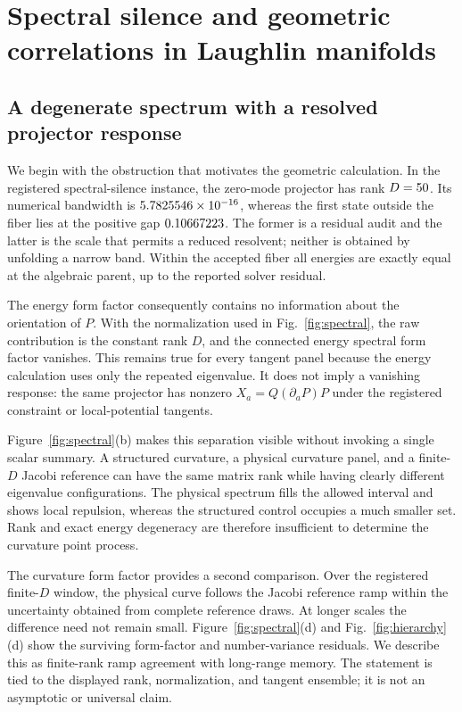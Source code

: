 \section{Spectral silence and geometric correlations in Laughlin manifolds}
\label{sec:laughlin-results}

\subsection{A degenerate spectrum with a resolved projector response}

We begin with the obstruction that motivates the geometric calculation.  In
the registered spectral-silence instance, the zero-mode projector has rank
$D=50$.  Its numerical bandwidth is
$5.7825546\times 10^{-16}$, whereas the first state outside the fiber lies at
the positive gap $0.10667223$.  The former is a residual audit and
the latter is the scale that permits a reduced resolvent; neither is obtained
by unfolding a narrow band.  Within the accepted fiber all energies are
exactly equal at the algebraic parent, up to the reported solver residual.

The energy form factor consequently contains no information about the
orientation of $P$.  With the normalization used in Fig.~\ref{fig:spectral},
the raw contribution is the constant rank $D$, and the connected energy
spectral form factor vanishes.  This remains true for every tangent panel
because the energy calculation uses only the repeated eigenvalue.  It does not
imply a vanishing response: the same projector has nonzero
$X_a=Q(\partial_aP)P$ under the registered constraint or local-potential
tangents.

Figure~\ref{fig:spectral}(b) makes this separation visible without invoking a
single scalar summary.  A structured curvature, a physical curvature panel,
and a finite-$D$ Jacobi reference can have the same matrix rank while having
clearly different eigenvalue configurations.  The physical spectrum fills
the allowed interval and shows local repulsion, whereas the structured
control occupies a much smaller set.  Rank and exact energy degeneracy are
therefore insufficient to determine the curvature point process.

The curvature form factor provides a second comparison.  Over the registered
finite-$D$ window, the physical curve follows the Jacobi reference ramp within
the uncertainty obtained from complete reference draws.  At longer scales the
difference need not remain small.  Figure~\ref{fig:spectral}(d) and
Fig.~\ref{fig:hierarchy}(d) show the surviving form-factor and number-variance
residuals.  We describe this as finite-rank ramp agreement with long-range
memory.  The statement is tied to the displayed rank, normalization, and
tangent ensemble; it is not an asymptotic or universal claim.

